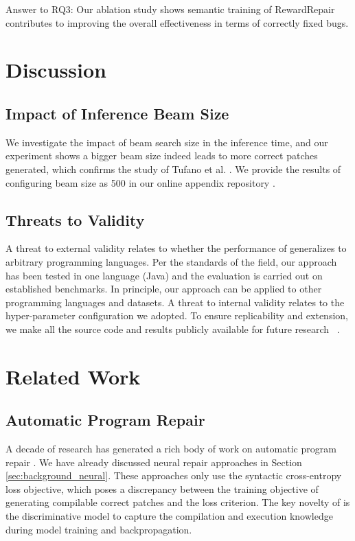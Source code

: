 \begin{mdframed}
Answer to RQ3: 
Our ablation study shows semantic training of RewardRepair contributes to improving the overall effectiveness in terms of correctly fixed bugs. 
\end{mdframed}

\section{ Discussion}

\subsection{Impact of Inference Beam Size}
We investigate the impact of beam search size in the inference time, and our experiment shows a bigger beam size indeed leads to more correct patches generated, which confirms the study of Tufano et al. \cite{Tufano-tse19}.
We provide the results of configuring beam size as 500 in our online appendix repository \cite{experiment}. 

\subsection{Threats to Validity}
\label{sec:threats}
A threat to external validity relates to whether the performance of \approach generalizes to arbitrary programming languages. Per the standards of the field, our approach has been tested in one language (Java) and the evaluation is carried out on established benchmarks. In principle, our approach can be applied to other programming languages and datasets. 
A threat to internal validity relates to the hyper-parameter configuration we
adopted.  To ensure replicability and extension, 
we make all the source code and results publicly available for future research ~\cite{experiment}.

\section{Related Work}

\subsection{Automatic Program Repair}

A decade of research has generated a rich body of work on automatic program repair \cite{Monperrus2015,TSE-repair-survey}. 
We have already discussed neural repair approaches  \cite{SEQUENCER,CoCoNuT,DLFix,Tufano-ICSE19,codit-tse20,Tufano-tse19,deepfix, Recoder,CURE-icse21} in Section \ref{sec:background_neural}. 
These approaches only use the syntactic cross-entropy loss objective, which poses a discrepancy between the training objective of generating compilable correct patches and the loss criterion.
The key novelty of \approach is the discriminative model to capture the compilation and execution knowledge during model training and backpropagation.

